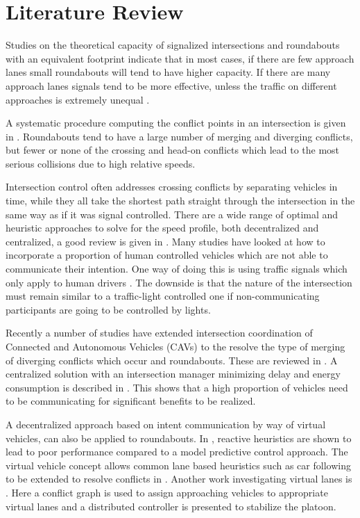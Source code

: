 \section{Literature Review} 
Studies on the theoretical capacity of signalized intersections and roundabouts with an equivalent footprint indicate that in most cases, if there are few approach lanes small roundabouts will tend to have higher capacity. If there are many approach lanes signals tend to be more effective, unless the traffic on different approaches is extremely unequal \cite{Jian-an2001}. 

A systematic procedure computing the conflict points in an intersection is given in \cite{Lu2013}. Roundabouts tend to have a large number of merging and diverging conflicts, but fewer or none of the crossing and head-on conflicts which lead to the most serious collisions due to high relative speeds.

Intersection control often addresses crossing conflicts by separating vehicles in time, while they all take the shortest path straight through the intersection in the same way as if it was signal controlled. There are a wide range of optimal and heuristic approaches to solve for the speed profile, both decentralized and centralized, a good review is given in \cite{Rios-Torres2017}. Many studies have looked at how to incorporate a proportion of human controlled vehicles which are not able to communicate their intention. One way of doing this is using traffic signals which only apply to human drivers \cite{Zhao2019}. The downside is that the nature of the intersection must remain similar to a traffic-light controlled one if non-communicating participants are going to be controlled by lights.

Recently a number of studies have extended intersection coordination of Connected and Autonomous Vehicles (CAVs) to the resolve the type of merging of diverging conflicts which occur and roundabouts. These are reviewed in \cite{Rios-Torres2017}. A centralized solution with an intersection manager minimizing delay and energy consumption is described in \cite{Zhao2018}. This shows that a high proportion of vehicles need to be communicating for significant benefits to be realized. 

A decentralized approach based on intent communication by way of virtual vehicles, can also be applied to roundabouts. In \cite{Debada2016}, reactive heuristics are shown to lead to poor performance compared to a model predictive control approach. The virtual vehicle concept allows common lane based heuristics such as car following to be extended to resolve conflicts in  \cite{Debada2018}. Another work investigating virtual lanes is \cite{Xu2018}. Here a conflict graph is used to assign approaching vehicles to appropriate virtual lanes and a distributed controller is presented to stabilize the platoon.

